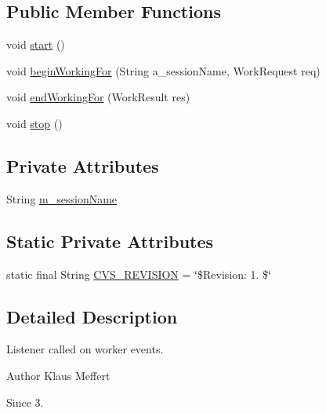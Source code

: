 \subsection*{Public Member Functions}
\begin{DoxyCompactItemize}
\item 
void \hyperlink{classexamples_1_1grid_1_1fitness_distributed_1_1_my_worker_feedback_ab1aa749f70a6978efe1f307f17254c0a}{start} ()
\item 
void \hyperlink{classexamples_1_1grid_1_1fitness_distributed_1_1_my_worker_feedback_a436007466bfc5585561e23ba328575b7}{begin\-Working\-For} (String a\-\_\-session\-Name, Work\-Request req)
\item 
void \hyperlink{classexamples_1_1grid_1_1fitness_distributed_1_1_my_worker_feedback_a59ac38bf88ca07aba1738c840e83658b}{end\-Working\-For} (Work\-Result res)
\item 
void \hyperlink{classexamples_1_1grid_1_1fitness_distributed_1_1_my_worker_feedback_a62b613f8d9e62d819e38c0e3db2352b8}{stop} ()
\end{DoxyCompactItemize}
\subsection*{Private Attributes}
\begin{DoxyCompactItemize}
\item 
String \hyperlink{classexamples_1_1grid_1_1fitness_distributed_1_1_my_worker_feedback_a7b59f71dd754389f3476578d9b6a685a}{m\-\_\-session\-Name}
\end{DoxyCompactItemize}
\subsection*{Static Private Attributes}
\begin{DoxyCompactItemize}
\item 
static final String \hyperlink{classexamples_1_1grid_1_1fitness_distributed_1_1_my_worker_feedback_ae8633ab42f09c8a8e6548074ed4767d0}{C\-V\-S\-\_\-\-R\-E\-V\-I\-S\-I\-O\-N} = \char`\"{}\$Revision\-: 1. \$\char`\"{}
\end{DoxyCompactItemize}


\subsection{Detailed Description}
Listener called on worker events.

\begin{DoxyAuthor}{Author}
Klaus Meffert 
\end{DoxyAuthor}
\begin{DoxySince}{Since}
3. 
\end{DoxySince}


